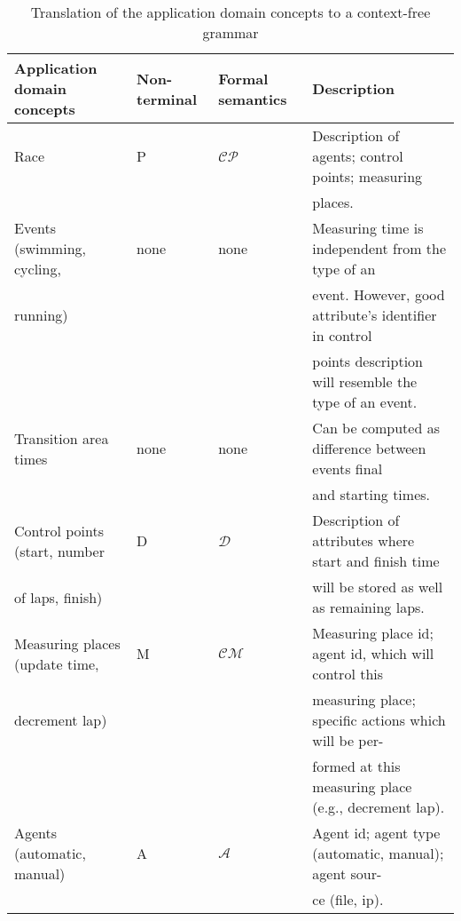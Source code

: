 \documentclass[preprint, prX]{revtex4}
\begin{document}
\begin{table*}[htb]        \caption{Translation of the application domain concepts to a context-free grammar}
\label{tab:tab1}
\vspace{-5mm}
\small
\begin{center}
\scalebox{0.7} {
\begin{tabular}{ l  l  l  l }
\hline
Application domain concepts &  Non-terminal & Formal semantics & Description \\
\hline
Race & P & $\mathcal{CP}$ & Description of agents; control points; measuring \\
 & & & places. \\
\hline
Events (swimming, cycling, & none & none & Measuring time is independent from the type of an \\
running) & & & event. However, good attribute's identifier in control \\
 & & & points description will resemble the type of an event. \\
\hline
Transition area times & none & none & Can be computed as difference between events final \\
 & & & and starting times. \\
\hline
Control points (start, number & D & $\mathcal{D}$ & Description of attributes where start and finish time \\
of laps, finish) & & & will be stored as well as remaining laps. \\
\hline
Measuring places (update time, & M & $\mathcal{CM}$ & Measuring place id; agent id, which will control this \\
decrement lap) & & & measuring place; specific actions which will be per- \\
 & & & formed at this measuring place (e.g., decrement lap). \\
\hline
Agents (automatic, manual) & A & $\mathcal{A}$ & Agent id; agent type (automatic, manual); agent sour- \\
 & & & ce (file, ip). \\
\hline
\end{tabular}
}
\end{center}
\normalsize
\vspace{-5mm}
\end{table*}
\end{document}
